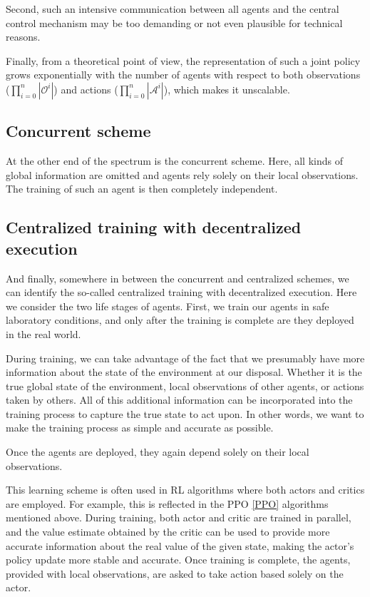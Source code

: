 Second, such an intensive communication between all agents and the central control mechanism may be too demanding or not even plausible for technical reasons.

Finally, from a theoretical point of view, the representation of such a joint policy grows exponentially with the number of agents with respect to both observations ($\prod_{i=0}^{n}{|\mathcal{O}^i|}$) and actions ($\prod_{i=0}^{n}|\mathcal{A}^i|$), which makes it unscalable.

\subsection*{Concurrent scheme}
At the other end of the spectrum is the concurrent scheme.
Here, all kinds of global information are omitted and agents rely solely on their local observations.
The training of such an agent is then completely independent.

\subsection*{Centralized training with decentralized execution}
And finally, somewhere in between the concurrent and centralized schemes, we can identify the so-called centralized training with decentralized execution.
Here we consider the two life stages of agents. 
First, we train our agents in safe laboratory conditions, and only after the training is complete are they deployed in the real world.

During training, we can take advantage of the fact that we presumably have more information about the state of the environment at our disposal.
Whether it is the true global state of the environment, local observations of other agents, or actions taken by others.
All of this additional information can be incorporated into the training process to capture the true state to act upon.
In other words, we want to make the training process as simple and accurate as possible.

Once the agents are deployed, they again depend solely on their local observations.

This learning scheme is often used in RL algorithms where both actors and critics are employed.
For example, this is reflected in the PPO \ref{PPO} algorithms mentioned above.
During training, both actor and critic are trained in parallel, and the value estimate obtained by the critic can be used to provide more accurate information about the real value of the given state, making the actor's policy update more stable and accurate.
Once training is complete, the agents, provided with local observations, are asked to take action based solely on the actor.

